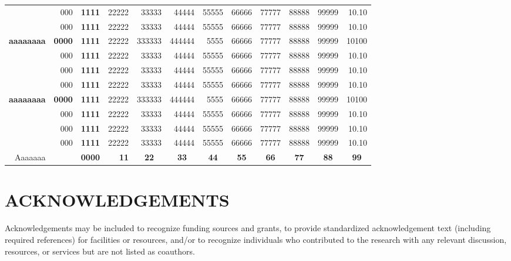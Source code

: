 \documentclass[9pt,article,twoside]{rmaa-rho-class/rmaa-rho}
\begin{document}
\begin{landscape}
\begin{table}[htbp]
\begin{tabular}{rrrrrrrrrrrr}
          & 000   & \textbf{1111} & 22222 & 33333 & 44444 & 55555  & 66666 & 77777 & 88888 & 99999 & 10.10 \\
          & 000   & \textbf{1111} & 22222 & 33333 & 44444 & 55555  & 66666 & 77777 & 88888 & 99999 & 10.10 \\
    \textbf{aaaaaaaa} & \textbf{0000} & \textbf{1111} & 22222 & 333333 & 444444 & 5555  & 66666 & 77777 & 88888 & 99999 & 10100 \\
          & 000   & \textbf{1111} & 22222 & 33333 & 44444 & 55555  & 66666 & 77777 & 88888 & 99999 & 10.10 \\
          & 000   & \textbf{1111} & 22222 & 33333 & 44444 & 55555  & 66666 & 77777 & 88888 & 99999 & 10.10 \\
          & 000   & \textbf{1111} & 22222 & 33333 & 44444 & 55555  & 66666 & 77777 & 88888 & 99999 & 10.10 \\
    \textbf{aaaaaaaa} & \textbf{0000} & \textbf{1111} & 22222 & 333333 & 444444 & 5555  & 66666 & 77777 & 88888 & 99999 & 10100 \\
          & 000   & \textbf{1111} & 22222 & 33333 & 44444 & 55555  & 66666 & 77777 & 88888 & 99999 & 10.10 \\
          & 000   & \textbf{1111} & 22222 & 33333 & 44444 & 55555  & 66666 & 77777 & 88888 & 99999 & 10.10 \\
          & 000   & \textbf{1111} & 22222 & 33333 & 44444 & 55555  & 66666 & 77777 & 88888 & 99999 & 10.10 \\
    \midrule
    Aaaaaaa &    & \textbf{0000} & \textbf{11} & \multicolumn{1}{c}{\textbf{22}} & \multicolumn{1}{c}{\textbf{33}} & \multicolumn{1}{c}{\textbf{44}} & \multicolumn{1}{c}{\textbf{55}} & \multicolumn{1}{c}{\textbf{66}} & \multicolumn{1}{c}{\textbf{77}} & \multicolumn{1}{c}{\textbf{88}} & \multicolumn{1}{c}{\textbf{99}} \\
    \bottomrule
    \end{tabular}%
  \label{tab:addlabel}%
\end{table}
\end{landscape}





\section{ACKNOWLEDGEMENTS}

Acknowledgements may be included to recognize funding sources and grants, to provide standardized acknowledgement text (including required references) for facilities or resources, and/or to recognize individuals who contributed to the research with any relevant discussion, resources, or services but are not listed as coauthors.
\end{document}
